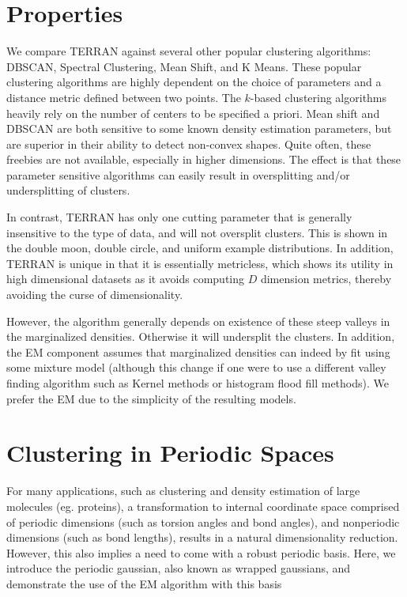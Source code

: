 \documentclass{acm_proc_article-sp}
\begin{document}
\section{Properties}

We compare TERRAN against several other popular clustering algorithms: DBSCAN, Spectral Clustering, Mean Shift, and K Means. These popular clustering algorithms are highly dependent on the choice of parameters and a distance metric defined between two points. The $k$-based clustering algorithms heavily rely on the number of centers to be specified a priori. Mean shift and DBSCAN are both sensitive to some known density estimation parameters, but are superior in their ability to detect non-convex shapes. Quite often, these freebies are not available, especially in higher dimensions. The effect is that these parameter sensitive algorithms can easily result in oversplitting and/or undersplitting of clusters. 

In contrast, TERRAN has only one cutting parameter that is generally insensitive to the type of data, and will not oversplit clusters. This is shown in the double moon, double circle, and uniform example distributions. In addition, TERRAN is unique in that it is essentially metricless, which shows its utility in high dimensional datasets as it avoids computing $D$ dimension metrics, thereby avoiding the curse of dimensionality.

However, the algorithm generally depends on existence of these steep valleys in the marginalized densities. Otherwise it will undersplit the clusters. In addition, the EM component assumes that marginalized densities can indeed by fit using some mixture model (although this change if one were to use a different valley finding algorithm such as Kernel methods or histogram flood fill methods). We prefer the EM due to the simplicity of the resulting models. 

\section{Clustering in Periodic Spaces}

For many applications, such as clustering and density estimation of large molecules (eg. proteins), a transformation to internal coordinate space comprised of periodic dimensions (such as torsion angles and bond angles), and nonperiodic dimensions (such as bond lengths), results in a natural dimensionality reduction. However, this also implies a need to come with a robust periodic basis. Here, we introduce the periodic gaussian, also known as wrapped gaussians, and demonstrate the use of the EM algorithm with this basis
\end{document}
